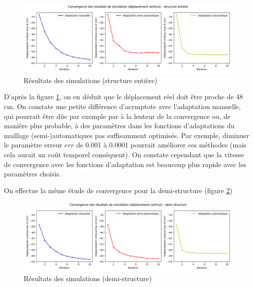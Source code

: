     \begin{figure}        
        \begin{center}
        
            \includegraphics[width=16.5cm]{imgs/cvg.png}
            \caption{Résultats des simulations (structure entière)}
            \label{fig:cvg}
        
        \end{center}
    \end{figure}

    D'après la figure \ref{fig:cvg}, on en déduit que le déplacement réel doit être proche de 48 cm. On constate une petite différence d'asymptote avec l'adaptation manuelle,
    qui pourrait être dûe par exemple par à la lenteur de la convergence ou, de manière plus probable, à des paramètres dans les fonctions d'adaptations du maillage
    (semi-)automatiques pas suffisamment optimisés. Par exemple, diminuer le paramètre erreur $err$ de 0.001 à 0.0001 pourrait améliorer ces méthodes (mais cela aurait un
    coût temporel conséquent). On constate cependant que la vitesse de convergence avec les fonctions d'adaptation est beaucoup plus rapide avec les paramètres choisis.

    On effectue la même étude de convergence pour la demi-structure (figure \ref{fig:h_cvg})

    \begin{figure}        
        \begin{center}
        
            \includegraphics[width=16.5cm]{imgs/cvgH.png}
            \caption{Résultats des simulations (demi-structure)}
            \label{fig:h_cvg}
        
        \end{center}
    \end{figure}

